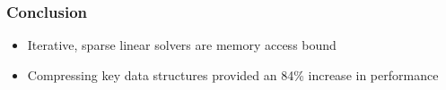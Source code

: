 \documentclass{beamer}
\begin{document}
\begin{frame}
	\frametitle{Conclusion}
	\begin{itemize}
		\item Iterative, sparse linear solvers are memory access bound
		\item Compressing key data structures provided an 84\% increase in performance
	\end{itemize}
\end{frame}
\end{document}

